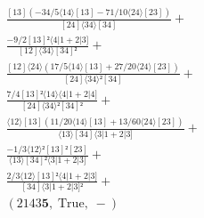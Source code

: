 \documentclass[varwidth, border=5pt]{standalone}
\begin{document}
\begin{my}
$\begin{gathered}
\scriptscriptstyle\frac{[13](-34/5⟨14⟩[13]-71/10⟨24⟩[23])}{[24]⟨34⟩[34]} +\\
\scriptscriptstyle\frac{-9/2[13]²⟨4|1+2|3]}{[12]⟨34⟩[34]²} +\\
\scriptscriptstyle\frac{[12]⟨24⟩(17/5⟨14⟩[13]+27/20⟨24⟩[23])}{[24]⟨34⟩²[34]} +\\
\scriptscriptstyle\frac{7/4[13]²⟨14⟩⟨4|1+2|4]}{[24]⟨34⟩²[34]²} +\\
\scriptscriptstyle\frac{⟨12⟩[13](11/20⟨14⟩[13]+13/60⟨24⟩[23])}{⟨13⟩[34]⟨3|1+2|3]} +\\
\scriptscriptstyle\frac{-1/3⟨12⟩²[13]²[23]}{⟨13⟩[34]²⟨3|1+2|3]} +\\
\scriptscriptstyle\frac{2/3⟨12⟩[13]²⟨4|1+2|3]}{[34]⟨3|1+2|3]²} +\\
\scriptscriptstyle(2143𝟓,\;\text{True},\;-) \phantom{+}
\end{gathered}$
\end{my}
\end{document}
